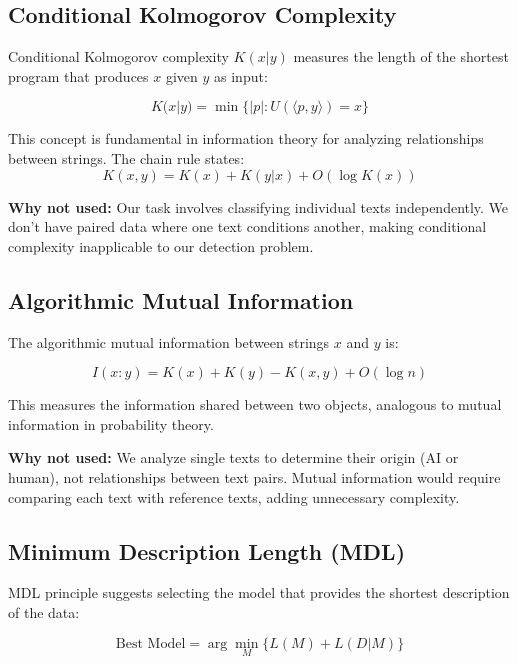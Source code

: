 \documentclass[12pt,a4paper]{report}
\begin{document}
\subsection{Conditional Kolmogorov Complexity}

Conditional Kolmogorov complexity $K(x|y)$ measures the length of the shortest program that produces $x$ given $y$ as input:

\begin{equation}
K(x|y) = \min\{|p| : U(\langle p, y \rangle) = x\}
\end{equation}

This concept is fundamental in information theory for analyzing relationships between strings. The chain rule states:
\begin{equation}
K(x, y) = K(x) + K(y|x) + O(\log K(x))
\end{equation}

\textbf{Why not used:} Our task involves classifying individual texts independently. We don't have paired data where one text conditions another, making conditional complexity inapplicable to our detection problem.

\subsection{Algorithmic Mutual Information}

The algorithmic mutual information between strings $x$ and $y$ is:

\begin{equation}
I(x:y) = K(x) + K(y) - K(x,y) + O(\log n)
\end{equation}

This measures the information shared between two objects, analogous to mutual information in probability theory.

\textbf{Why not used:} We analyze single texts to determine their origin (AI or human), not relationships between text pairs. Mutual information would require comparing each text with reference texts, adding unnecessary complexity.

\subsection{Minimum Description Length (MDL)}

MDL principle suggests selecting the model that provides the shortest description of the data:

\begin{equation}
\text{Best Model} = \arg\min_M \{L(M) + L(D|M)\}
\end{equation}
\end{document}
